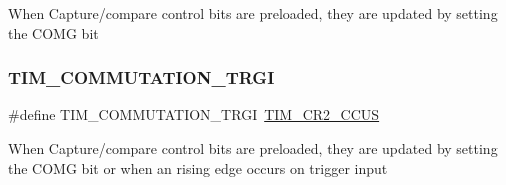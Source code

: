 When Capture/compare control bits are preloaded, they are updated by setting the C\+O\+MG bit \mbox{\label{group___t_i_m___commutation___source_gab2e11763b5e061a5b3056ac970f57ab1}} 
\subsubsection{\texorpdfstring{T\+I\+M\+\_\+\+C\+O\+M\+M\+U\+T\+A\+T\+I\+O\+N\+\_\+\+T\+R\+GI}{TIM\_COMMUTATION\_TRGI}}
{\footnotesize\ttfamily \#define T\+I\+M\+\_\+\+C\+O\+M\+M\+U\+T\+A\+T\+I\+O\+N\+\_\+\+T\+R\+GI~\hyperlink{group___peripheral___registers___bits___definition_gaf0328c1339b2b1633ef7a8db4c02d0d5}{T\+I\+M\+\_\+\+C\+R2\+\_\+\+C\+C\+US}}

When Capture/compare control bits are preloaded, they are updated by setting the C\+O\+MG bit or when an rising edge occurs on trigger input 